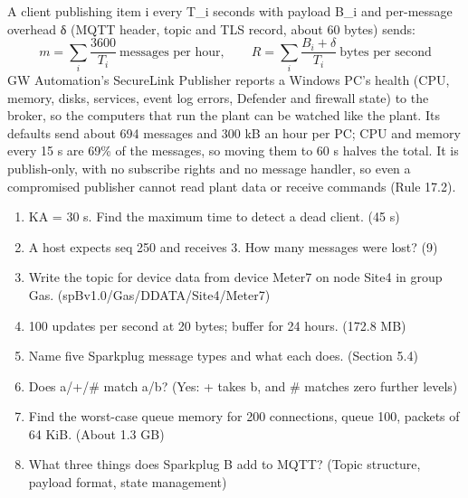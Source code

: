  A client publishing item i every T\_i seconds with payload B\_i and per-message overhead δ (MQTT header, topic and TLS record, about 60 bytes) sends:
\[ m = \sum_i \frac{3600}{T_i}\ \text{messages per hour}, \qquad R = \sum_i \frac{B_i + \delta}{T_i}\ \text{bytes per second} \]
 GW Automation's SecureLink Publisher reports a Windows PC's health (CPU, memory, disks, services, event log errors, Defender and firewall state) to the broker, so the computers that run the plant can be watched like the plant. Its defaults send about 694 messages and 300 kB an hour per PC; CPU and memory every 15 s are 69\% of the messages, so moving them to 60 s halves the total. It is publish-only, with no subscribe rights and no message handler, so even a compromised publisher cannot read plant data or receive commands (Rule 17.2).

\begin{enumerate}
\item KA = 30 s. Find the maximum time to detect a dead client. (45 s)
\item A host expects seq 250 and receives 3. How many messages were lost? (9)
\item Write the topic for device data from device Meter7 on node Site4 in group Gas. (spBv1.0/Gas/DDATA/Site4/Meter7)
\item 100 updates per second at 20 bytes; buffer for 24 hours. (172.8 MB)
\item Name five Sparkplug message types and what each does. (Section 5.4)
\item Does a/+/\# match a/b? (Yes: + takes b, and \# matches zero further levels)
\item Find the worst-case queue memory for 200 connections, queue 100, packets of 64 KiB. (About 1.3 GB)
\item What three things does Sparkplug B add to MQTT? (Topic structure, payload format, state management)
\end{enumerate}
